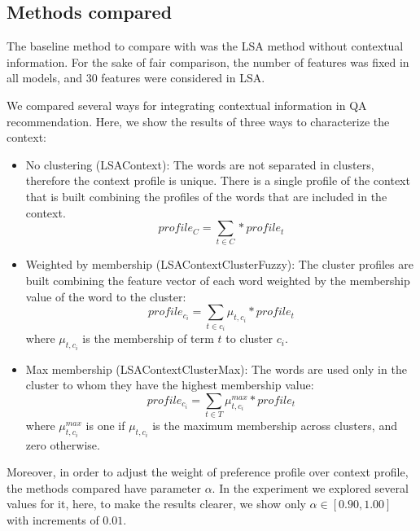 \documentclass[preprint]{elsarticle}
\begin{document}
\begin{spacing}{1.5}
\subsection{Methods compared}

The baseline method to compare with was the LSA method without contextual information. For the sake of fair comparison, the number of features was fixed in all models, and 30 features were considered in LSA.

We compared several ways for integrating contextual information in QA recommendation. Here, we show the results of three ways to characterize the context:

\begin{itemize}

	\item No clustering (LSAContext): The words are not separated in clusters, therefore the context profile is unique. There is a single profile of the context that is built combining the profiles of the words that are included in the context.
	\begin{equation}
		profile_{C} = \sum_{t \in C} * profile_t
	\end{equation}

	\item Weighted by membership (LSAContextClusterFuzzy): The cluster profiles are built combining the feature vector of each word weighted by the membership value of the word to the cluster:
	\begin{equation}
		profile_{c_i} = \sum_{t \in c_i} \mu_{t,c_i} * profile_t
	\end{equation}
	\noindent where $\mu_{t,c_i}$ is the membership of term $t$ to cluster $c_i$.

	\item Max membership (LSAContextClusterMax): The words are used only in the cluster to whom they have the highest membership value:
	\begin{equation}
		profile_{c_i} = \sum_{t \in T} \mu^{max}_{t,c_i} * profile_t
	\end{equation}
	\noindent where $\mu^{max}_{t,c_i}$ is one if $\mu_{t,c_i}$ is the maximum membership across clusters, and zero otherwise.

\end{itemize}

Moreover, in order to adjust the weight of preference profile over context profile, the methods compared have parameter $\alpha$. In the experiment we explored several values for it, here, to make the results clearer, we show only $\alpha \in [0.90,1.00]$ with increments of $0.01$.


\end{spacing}
\end{document}
